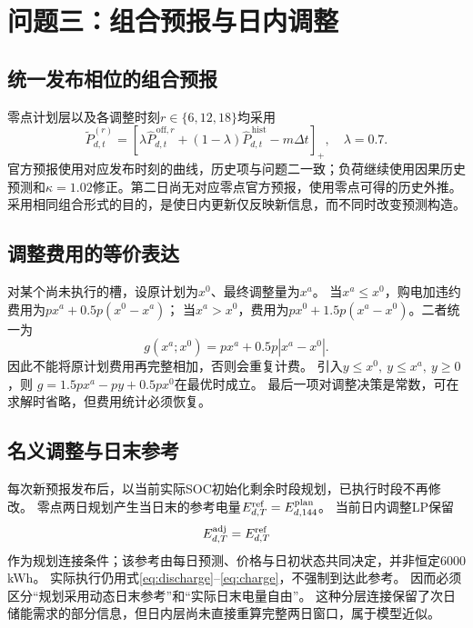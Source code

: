 \section{问题三：组合预报与日内调整}
\subsection{统一发布相位的组合预报}
零点计划层以及各调整时刻$r\in\{6,12,18\}$均采用
\begin{equation}
\widetilde P^{(r)}_{d,t}=
\left[\lambda\widehat P^{\,\mathrm{off},r}_{d,t}
+(1-\lambda)\widehat P^{\,\mathrm{hist}}_{d,t}-m\Delta t\right]_+,
\quad \lambda=0.7.
\label{eq:mix}
\end{equation}
官方预报使用对应发布时刻的曲线，历史项与问题二一致；负荷继续使用因果历史预测和$\kappa=1.02$修正。第二日尚无对应零点官方预报，使用零点可得的历史外推。
采用相同组合形式的目的，是使日内更新仅反映新信息，而不同时改变预测构造。

\subsection{调整费用的等价表达}
对某个尚未执行的槽，设原计划为$x^0$、最终调整量为$x^a$。
当$x^a\leq x^0$，购电加违约费用为$px^a+0.5p(x^0-x^a)$；
当$x^a>x^0$，费用为$px^0+1.5p(x^a-x^0)$。二者统一为
\begin{equation}
g(x^a;x^0)=px^a+0.5p|x^a-x^0|.
\label{eq:adjustcost}
\end{equation}
因此不能将原计划费用再完整相加，否则会重复计费。
引入$y\leq x^0,\ y\leq x^a,\ y\geq0$，则
$g=1.5px^a-py+0.5px^0$在最优时成立。
最后一项对调整决策是常数，可在求解时省略，但费用统计必须恢复。

\subsection{名义调整与日末参考}
每次新预报发布后，以当前实际SOC初始化剩余时段规划，已执行时段不再修改。
零点两日规划产生当日末的参考电量$E^{\rm ref}_{d,T}=E^{\rm plan}_{d,144}$。
当前日内调整LP保留
\begin{equation}
E^{\rm adj}_{d,T}=E^{\rm ref}_{d,T}
\label{eq:adjterminal}
\end{equation}
作为规划连接条件；该参考由每日预测、价格与日初状态共同决定，并非恒定6000 kWh。
实际执行仍用式\eqref{eq:discharge}--\eqref{eq:charge}，不强制到达此参考。
因而必须区分“规划采用动态日末参考”和“实际日末电量自由”。
这种分层连接保留了次日储能需求的部分信息，但日内层尚未直接重算完整两日窗口，属于模型近似。

